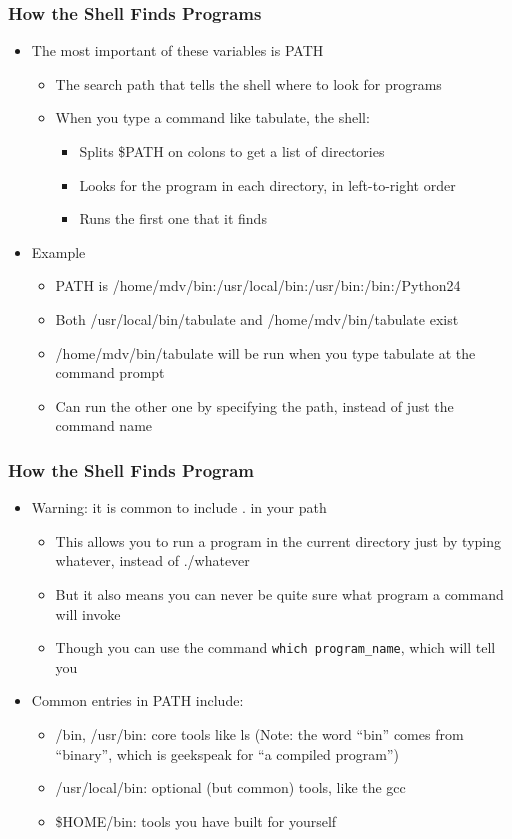 \begin{frame}\frametitle{How the Shell Finds Programs}
\begin{itemize}
\item The most important of these variables is PATH
\begin{itemize}
    \item The search path that tells the shell where to look for programs
    \item When you type a command like tabulate, the shell:
\begin{itemize}
          \item Splits \$PATH on colons to get a list of directories
          \item Looks for the program in each directory, in left-to-right order
          \item Runs the first one that it finds
\end{itemize}
\end{itemize}
\item Example
\begin{itemize}
    \item PATH is /home/mdv/bin:/usr/local/bin:/usr/bin:/bin:/Python24
    \item Both /usr/local/bin/tabulate and /home/mdv/bin/tabulate exist
    \item /home/mdv/bin/tabulate will be run when you type tabulate at the command prompt
    \item Can run the other one by specifying the path, instead of just the command name
\end{itemize}
\end{itemize}
\end{frame}

\begin{frame}[fragile]\frametitle{How the Shell Finds Program}
\begin{itemize}
\item Warning: it is common to include . in your path
\begin{itemize}
    \item This allows you to run a program in the current directory just by typing whatever, 
instead of ./whatever
    \item  But it also means you can never be quite sure what program a command will invoke
    \item  Though you can use the command \lstinline!which program_name!, which will tell you
\end{itemize}
\item Common entries in PATH include:
\begin{itemize}
    \item /bin, /usr/bin: core tools like ls (Note: the word “bin” comes from “binary”, which is geekspeak for “a compiled program”)
    \item  /usr/local/bin: optional (but common) tools, like the gcc
    \item \$HOME/bin: tools you have built for yourself
\end{itemize}          
\end{itemize}
\end{frame}

